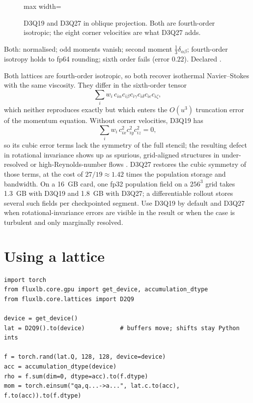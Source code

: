\begin{figure}[h]
\centering
\begin{adjustbox}{max width=\linewidth}\end{adjustbox}
\caption{D3Q19 and D3Q27 in oblique projection. Both are fourth-order isotropic; the eight
corner velocities are what D3Q27 adds.}
\label{fig:d3q}
\end{figure}

\begin{verified}
Both: normalised; odd moments vanish; second moment $\tfrac13\delta_{\alpha\beta}$;
fourth-order isotropy holds to fp64 rounding; sixth order fails (error $0.22$). Declared
.
\end{verified}

Both lattices are fourth-order isotropic, so both recover isothermal Navier--Stokes with the
same viscosity. They differ in the sixth-order tensor
\[
\sum_i w_i\, c_{i\alpha}c_{i\beta}c_{i\gamma}c_{i\delta}c_{i\epsilon}c_{i\zeta},
\]
which neither reproduces exactly but which enters the $O(u^3)$ truncation error of the
momentum equation. Without corner velocities,
D3Q19 has
\[
\sum_i w_i\, c_{ix}^2 c_{iy}^2 c_{iz}^2 = 0,
\]
so its cubic error terms lack the symmetry of the full stencil; the resulting defect in rotational invariance shows up as
spurious, grid-aligned structures in under-resolved or high-Reynolds-number flows
\parencite{WhiteChong2011,SilvaSemiao2014}. D3Q27 restores the cubic symmetry of those
terms, at the cost of $27/19 \approx 1.42$ times the population storage and bandwidth. On a
\SI{16}{GB} card, one fp32 population field on a $256^3$ grid takes \SI{1.3}{GB} with D3Q19
and \SI{1.8}{GB} with D3Q27; a differentiable rollout stores several such fields per
checkpointed segment. Use D3Q19 by default and D3Q27 when rotational-invariance errors are
visible in the result or when the case is turbulent and only marginally resolved.


\section{Using a lattice}

\begin{lstlisting}[style=py]
import torch
from fluxlb.core.gpu import get_device, accumulation_dtype
from fluxlb.core.lattices import D2Q9

device = get_device()
lat = D2Q9().to(device)          # buffers move; shifts stay Python ints

f = torch.rand(lat.Q, 128, 128, device=device)
acc = accumulation_dtype(device)
rho = f.sum(dim=0, dtype=acc).to(f.dtype)
mom = torch.einsum("qa,q...->a...", lat.c.to(acc), f.to(acc)).to(f.dtype)
\end{lstlisting}

